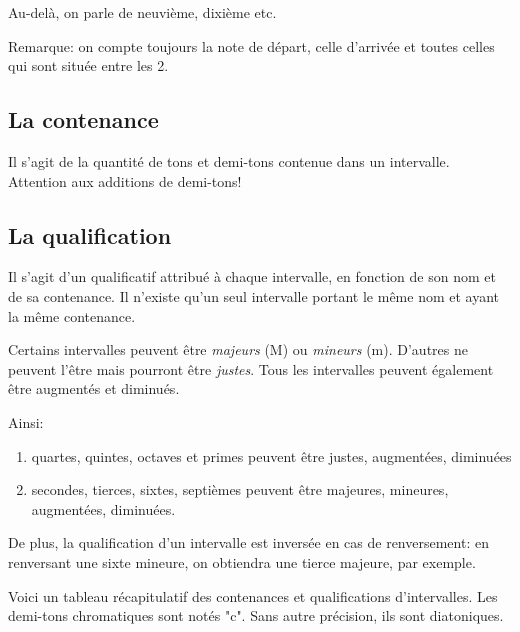 \documentclass[11pt]{scrreprt}
\begin{document}
Au-delà, on parle de neuvième, dixième etc.

Remarque: on compte toujours la note de départ, celle d'arrivée et toutes celles qui sont située entre les 2.
\subsection{La contenance}
Il s'agit de la quantité de tons et demi-tons contenue dans un intervalle. Attention aux additions de demi-tons!

\subsection{La qualification}
Il s'agit d'un qualificatif attribué à chaque intervalle, en fonction de son nom et de sa contenance. Il n'existe qu'un seul intervalle portant le même nom et ayant la même contenance.

Certains intervalles peuvent être \emph{majeurs} (M) ou \emph{mineurs} (m). D'autres ne peuvent l'être mais pourront être \emph{justes}. Tous les intervalles peuvent également être augmentés et diminués.

Ainsi:
\begin{enumerate}
\item quartes, quintes, octaves et primes peuvent être justes, augmentées, diminuées
\item secondes, tierces, sixtes, septièmes peuvent être majeures, mineures, augmentées, diminuées.
\end{enumerate}

De plus, la qualification d'un intervalle est inversée en cas de renversement: en renversant une sixte mineure, on obtiendra une tierce majeure, par exemple.

Voici un tableau récapitulatif des contenances et qualifications d'intervalles. Les demi-tons chromatiques sont notés "c". Sans autre précision, ils sont diatoniques.
\end{document}
